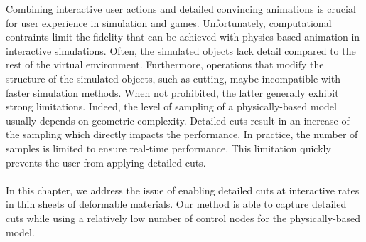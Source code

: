 
Combining interactive user actions and detailed convincing animations is crucial for user experience in simulation and games. Unfortunately, computational contraints limit the 
fidelity that can be achieved with physics-based animation
in interactive simulations. Often, the simulated objects lack detail compared to the rest of the virtual environment.
Furthermore, operations that modify the structure of the simulated objects, such as cutting, 
maybe incompatible with faster simulation methods.
When not prohibited, the latter generally exhibit strong limitations. Indeed, the level of sampling of a physically-based model usually depends on geometric complexity. Detailed cuts result in an increase of the sampling which directly impacts the performance. In practice, the number of samples is limited to ensure real-time performance. This limitation quickly prevents the user from applying detailed cuts.  
\\ \\
In this chapter, we address the issue of enabling detailed cuts at interactive rates in  thin sheets of deformable materials. Our method is able to capture detailed cuts while using a relatively low number of control nodes for the physically-based model.
